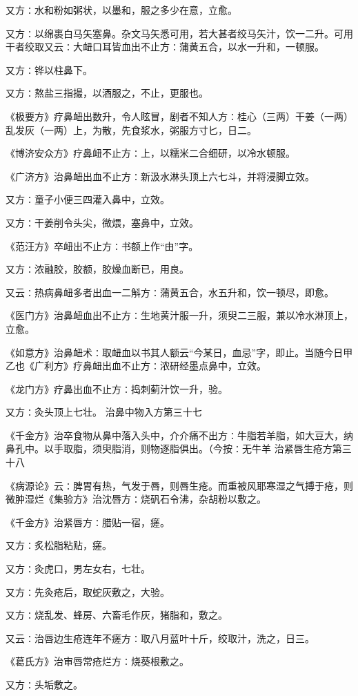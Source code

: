 \documentclass[a4paper,12pt,UTF8,twoside]{ctexbook}
\begin{document}
又方∶水和粉如粥状，以墨和，服之多少在意，立愈。

又方∶以绵裹白马矢塞鼻。杂文马矢悉可用，若大甚者绞马矢汁，饮一二升。可用干者绞取又云∶大衄口耳皆血出不止方∶蒲黄五合，以水一升和，一顿服。

又方∶铧以柱鼻下。

又方∶熬盐三指撮，以酒服之，不止，更服也。

《极要方》疗鼻衄出数升，令人眩冒，剧者不知人方∶桂心（三两）干姜（一两）乱发灰（一两）上，为散，先食浆水，粥服方寸匕，日二。

《博济安众方》疗鼻衄不止方∶上，以糯米二合细研，以冷水顿服。

《广济方》治鼻衄出血不止方∶新汲水淋头顶上六七斗，并将浸脚立效。

又方∶童子小便三四灌入鼻中，立效。

又方∶干姜削令头尖，微煨，塞鼻中，立效。

《范汪方》卒衄出不止方∶书额上作“由”字。

又方∶浓融胶，胶额，胶燥血断已，用良。

又云∶热病鼻衄多者出血一二斛方∶蒲黄五合，水五升和，饮一顿尽，即愈。

《医门方》治鼻衄血出不止方∶生地黄汁服一升，须臾二三服，兼以冷水淋顶上，立愈。

《如意方》治鼻衄术∶取衄血以书其人额云“今某日，血忌”字，即止。当随今日甲乙也《广利方》疗鼻衄出血不止方∶浓研经墨点鼻中，立效。

《龙门方》疗鼻出血不止方∶捣刺蓟汁饮一升，验。

又方∶灸头顶上七壮。
治鼻中物入方第三十七

《千金方》治卒食物从鼻中落入头中，介介痛不出方∶牛脂若羊脂，如大豆大，纳鼻孔中。以手取脂，须臾脂消，则物逐脂俱出。（今按∶无牛羊
治紧唇生疮方第三十八

《病源论》云∶脾胃有热，气发于唇，则唇生疮。而重被风耶寒湿之气搏于疮，则微肿湿烂《集验方》治沈唇方∶烧矾石令沸，杂胡粉以敷之。

《千金方》治紧唇方∶腊贴一宿，瘥。

又方∶炙松脂粘贴，瘥。

又方∶灸虎口，男左女右，七壮。

又方∶先灸疮后，取蛇灰敷之，大验。

又方∶烧乱发、蜂房、六畜毛作灰，猪脂和，敷之。

又云∶治唇边生疮连年不瘥方∶取八月蓝叶十斤，绞取汁，洗之，日三。

《葛氏方》治审唇常疮烂方∶烧葵根敷之。

又方∶头垢敷之。
\end{document}
